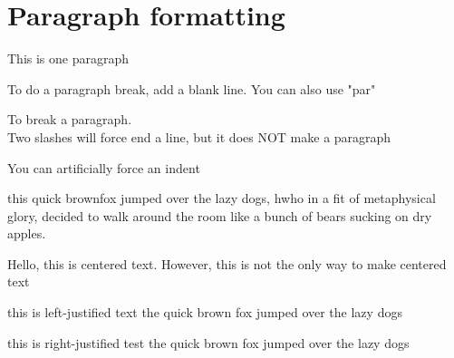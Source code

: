 \documentclass[12pt]{report}
\begin{document}
\chapter{Paragraph formatting}
\setlength{\parindent}{10ex} %
\setlength{\parskip}{1em} %


This is one paragraph

To do a paragraph break, add a blank line. You can also use "par"\par 
To break a paragraph.\\ 
Two slashes will force end a line, but it does NOT make a paragraph 

\indent \indent You can artificially force an indent 

this quick brownfox jumped over the lazy dogs, hwho in a fit of metaphysical glory, decided to walk around the room like a bunch of bears sucking on dry apples. 

\begin{center}
Hello, this is centered text. However, this is not the only way to make centered text
\end{center}

\begin{flushleft}
this is left-justified text the quick brown fox jumped over the lazy dogs 
\end{flushleft}

\begin{flushright}
this is right-justified test the quick brown fox jumped over the lazy dogs 
\end{flushright}
\end{document}
